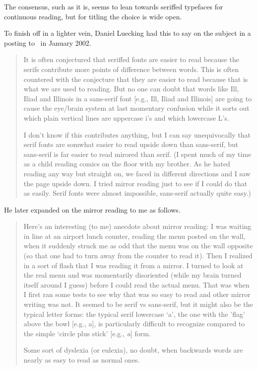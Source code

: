 \documentclass[10pt,a4paper,oneside,extrafontsizes]{memoir}%
\begin{document}
\begin{paracol}{2}
\begin{itemize}
\end{itemize}

    The consensus, such as it is, seems to lean towards seriffed
typefaces for continuous reading, but for titling the choice is
wide open.


    To finish off in a lighter vein,  
    Daniel Luecking had this to say on the subject
in a posting to \pixctt\ in January 2002.
\begin{quotation}
    It is often conjectured that seriffed fonts are easier to read because
the serifs contribute more points of difference between words. This is
often countered with the conjecture that they are easier to read because 
that is what we are used to reading. But no one can doubt that words
like Ill, Iliad and Illinois in a sans-serif font 
[e.g., \textsf{Ill, Iliad and Illinois}] are going to cause the eye/brain 
system at last momentary confusion while it sorts out which plain vertical
lines are uppercase i's and which lowercase L's.

    I don't know if this contributes anything, but I can say unequivocally
that serif fonts are somwhat easier to read upside down than sans-serif,
but sans-serif is far easier to read mirored than serif. (I spent much
of my time as a child reading comics on the floor with my brother. As
he hated reading any way but straight on, we faced in different directions
and I saw the page upside down. I tried mirror reading just to see if
I could do that as easily. Serif fonts were almost impossible, sans-serif
actually quite easy.)

\end{quotation}

    He later expanded on the mirror reading to me as follows.
\begin{quotation}
Here's an interesting (to me) anecdote about mirror reading: I was waiting
in line at an airport lunch counter, reading the menu posted on the wall,
when it suddenly struck me as odd that the menu was on the wall opposite
(so that one had to turn away from the counter to read it). Then I
realized in a sort of flash that I was reading it from a mirror. I turned
to look at the real menu and was momentarily disoriented (while my brain
turned itself around I guess) before I could read the actual menu. That
was when I first ran some tests to see why that was so easy to read and
other mirror writing was not. It seemed to be serif vs sans-serif, but
it might also be the typical letter forms: the typical serif lowercase
`a', the one with the 'flag' above the bowl [e.g., a], is particularly 
difficult to recognize compared to the simple `circle plus stick' 
[e.g., \textit{a}] form.

    Some sort of dyslexia (or eulexia), no doubt, when backwards
words are nearly as easy to read as normal ones.
\end{quotation}
\end{paracol}
\end{document}

